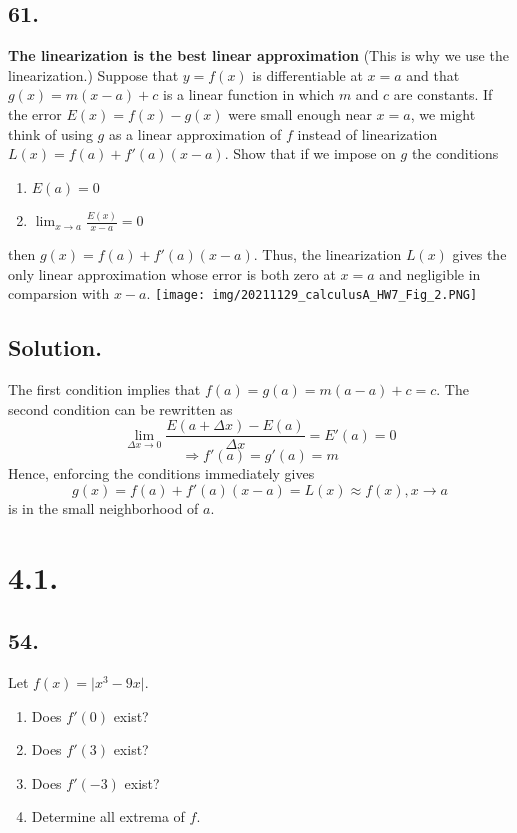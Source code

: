\documentclass{article}
\begin{document}
\subsection*{61.}
\textbf{The linearization is the best linear approximation} (This is why we use the linearization.) Suppose that $y=f(x)$ is differentiable at $x=a$ and that $g(x)=m(x-a)+c$ is a linear function in which $m$ and $c$ are constants. If the error $E(x)=f(x)-g(x)$ were small enough near $x=a$, we might think of using $g$ as a linear approximation of $f$ instead of linearization $L(x)=f(a)+f'(a)(x-a)$. Show that if we impose on $g$ the conditions
\begin{enumerate}
    \item $E(a)=0$
    \item $\lim _{x\to a} \frac{E(x)}{x-a}=0$
\end{enumerate}
then $g(x)=f(a)+f'(a)(x-a)$. Thus, the linearization $L(x)$ gives the only linear approximation whose error is both zero at $x=a$ and negligible in comparsion with $x-a$.\newline
\texttt{[image: img/20211129\_calculusA\_HW7\_Fig\_2.PNG]}
\subsection*{Solution.}
The first condition implies that $f(a)=g(a)=m(a-a)+c=c$.\newline
The second condition can be rewritten as
\[\lim _{\Delta x\to 0} \frac{E(a+\Delta x)-E(a)}{\Delta x}=E'(a)=0\]
\[\Rightarrow f'(a)=g'(a)=m\]
Hence, enforcing the conditions immediately gives
\[g(x)=f(a)+f'(a)(x-a)=L(x)\approx f(x), x\to a \]
is in the small neighborhood of $a$.
\section*{4.1.}
\subsection*{54.}
Let $f(x)=\vert x^3-9x\vert$.
\begin{enumerate} [label=\textbf{\alph*.}]
    \item Does $f'(0)$ exist?
    \item Does $f'(3)$ exist?
    \item Does $f'(-3)$ exist?
    \item Determine all extrema of $f$.
\end{enumerate}
\end{document}
